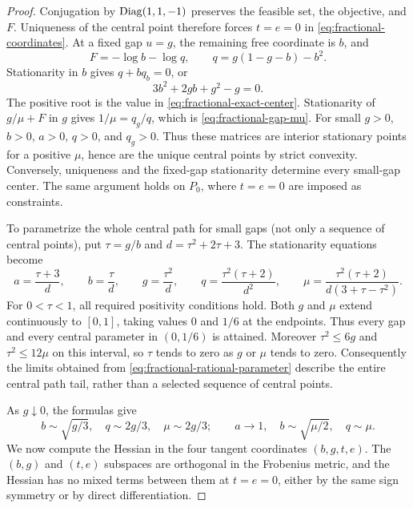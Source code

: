 \begin{proof}
Conjugation by $\operatorname{Diag}(1,1,-1)$ preserves the feasible set,
the objective, and $F$. Uniqueness of the central point therefore
forces $t=e=0$ in \eqref{eq:fractional-coordinates}. At a fixed
gap $u=g$, the remaining free coordinate is $b$, and
\[
 F=-\log b-\log q,\qquad
 q=g(1-g-b)-b^2.
\]
Stationarity in $b$ gives $q+bq_b=0$, or
\[
 3b^2+2gb+g^2-g=0.
\]
The positive root is the value in
\eqref{eq:fractional-exact-center}. Stationarity of $g/\mu+F$ in $g$ gives
$1/\mu=q_g/q$, which is \eqref{eq:fractional-gap-mu}.
For small $g>0$, $b>0$, $a>0$, $q>0$, and $q_g>0$.
Thus these matrices are interior stationary points for a positive
$\mu$, hence are the unique central points by strict convexity.
Conversely, uniqueness and the fixed-gap stationarity determine every
small-gap center. The same argument holds on $P_0$, where $t=e=0$
are imposed as constraints.

To parametrize the whole central path for small gaps (not only a
sequence of central points), put
$\tau=g/b$ and $d=\tau^2+2\tau+3$. The stationarity equations become
\begin{equation}
 a=\frac{\tau+3}{d},\qquad b=\frac\tau d,\qquad
 g=\frac{\tau^2}{d},\qquad q=\frac{\tau^2(\tau+2)}{d^2},\qquad
 \mu=\frac{\tau^2(\tau+2)}{d(3+\tau-\tau^2)}.
 \label{eq:fractional-rational-parameter}
\end{equation}
For $0<\tau<1$, all required positivity conditions hold. Both $g$ and
$\mu$ extend continuously to $[0,1]$, taking values $0$ and $1/6$ at
the endpoints. Thus every gap and every central parameter in $(0,1/6)$
is attained. Moreover $\tau^2\leq6g$ and $\tau^2\leq12\mu$ on this
interval, so $\tau$ tends to zero as $g$ or $\mu$ tends to zero. Consequently the limits obtained from
\eqref{eq:fractional-rational-parameter} describe the entire central
path tail, rather than a selected sequence of central points.

As $g\downarrow0$, the formulas give
\begin{equation}
 b\sim\sqrt{g/3},\quad q\sim2g/3,\quad
 \mu\sim2g/3;\qquad
 a\to1,\quad b\sim\sqrt{\mu/2},\quad q\sim\mu.
 \label{eq:fractional-basic-asymptotics}
\end{equation}
We now compute the Hessian in the four tangent coordinates
$(b,g,t,e)$. The $(b,g)$ and $(t,e)$ subspaces are orthogonal
in the Frobenius metric, and the Hessian has no mixed terms between
them at $t=e=0$, either by the same sign symmetry or by direct
differentiation.


\end{proof}
